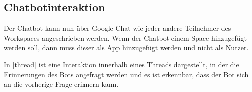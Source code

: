 \subsection{Chatbotinteraktion}
Der Chatbot kann nun über Google Chat wie jeder 
andere Teilnehmer des Workspaces angeschrieben werden.
Wenn der Chatbot einem Space hinzugefügt werden soll, dann 
muss dieser als App hinzugefügt werden und nicht als Nutzer.\par
In \ref*{thread} ist eine Interaktion innerhalb eines Threads dargestellt, in der die 
Erinnerungen des Bots angefragt werden und es ist 
erkennbar, dass der Bot sich an die vorherige Frage erinnern kann.